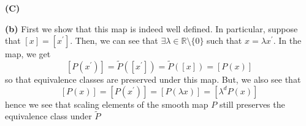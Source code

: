 \documentclass[10pt]{article}
\newcommand{\R}{\mathbb{R}}
\begin{document}
\textbf{(C)}

\textbf{(b)} First we show that this map is indeed well defined. In particular, suppose that $[x] = [x^{\prime}]$. Then, we can see that $\exists \lambda \in \R\setminus \{0\}$ such that $x = \lambda x^{\prime}$. In the map, we get
$$[P(x^{\prime})] = \tilde{P}([x^{\prime}]) = \tilde{P}([x]) = [P(x)]$$
so that equivalence classes are preserved under this map. But, we also see that
$$[P(x)] = [P(x^{\prime})] = [P(\lambda x)] = [\lambda^{d}P(x)]$$
hence we see that scaling elements of the smooth map $P$ still preserves the equivalence class under $\tilde{P}$
\end{document}
